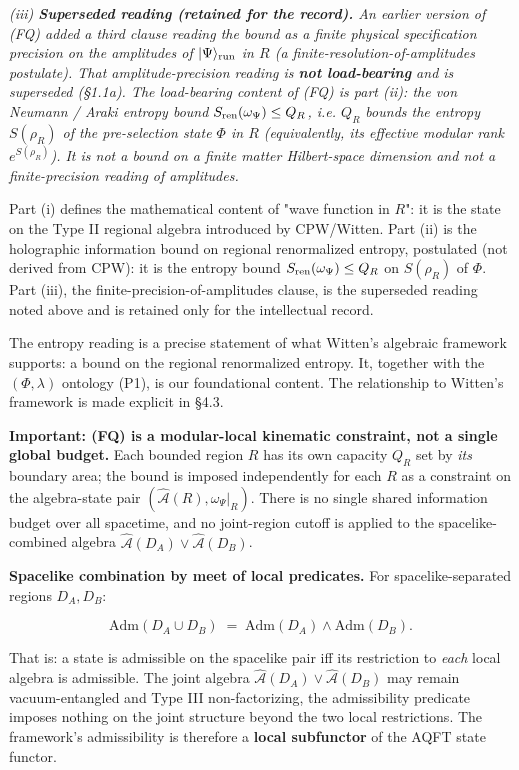 \documentclass[11pt,a4paper]{article}
\begin{document}
\emph{(iii) \textbf{Superseded reading (retained for the record).} An earlier version of (FQ) added a third clause reading the bound as a finite physical specification precision on the amplitudes of $|\Psi\rangle_{\rm run}$ in $R$ (a finite-resolution-of-amplitudes postulate). That amplitude-precision reading is \textbf{not load-bearing} and is superseded (§1.1a). The load-bearing content of (FQ) is part (ii): the von Neumann / Araki entropy bound $S_{\rm ren}(\omega_\Psi) \le Q_R$, i.e. $Q_R$ bounds the entropy $S(\rho_R)$ of the pre-selection state $\Phi$ in $R$ (equivalently, its effective modular rank $e^{S(\rho_R)}$). It is not a bound on a finite matter Hilbert-space dimension and not a finite-precision reading of amplitudes.}

Part (i) defines the mathematical content of "wave function in $R$": it is the state on the Type II regional algebra introduced by CPW/Witten. Part (ii) is the holographic information bound on regional renormalized entropy, postulated (not derived from CPW): it is the entropy bound $S_{\rm ren}(\omega_\Psi) \le Q_R$ on $S(\rho_R)$ of $\Phi$. Part (iii), the finite-precision-of-amplitudes clause, is the superseded reading noted above and is retained only for the intellectual record.

The entropy reading is a precise statement of what Witten's algebraic framework supports: a bound on the regional renormalized entropy. It, together with the $(\Phi,\lambda)$ ontology (P1), is our foundational content. The relationship to Witten's framework is made explicit in §4.3.

\textbf{Important: (FQ) is a modular-local kinematic constraint, not a single global budget.} Each bounded region $R$ has its own capacity $Q_R$ set by \emph{its} boundary area; the bound is imposed independently for each $R$ as a constraint on the algebra-state pair $(\hat{\mathcal{A}}(R), \omega_\Psi|_R)$. There is no single shared information budget over all spacetime, and no joint-region cutoff is applied to the spacelike-combined algebra $\hat{\mathcal{A}}(D_A) \vee \hat{\mathcal{A}}(D_B)$.

\textbf{Spacelike combination by meet of local predicates.} For spacelike-separated regions $D_A, D_B$:

\[
\mathrm{Adm}(D_A \cup D_B) \;=\; \mathrm{Adm}(D_A) \wedge \mathrm{Adm}(D_B).
\]

That is: a state is admissible on the spacelike pair iff its restriction to \emph{each} local algebra is admissible. The joint algebra $\hat{\mathcal{A}}(D_A) \vee \hat{\mathcal{A}}(D_B)$ may remain vacuum-entangled and Type III non-factorizing, the admissibility predicate imposes nothing on the joint structure beyond the two local restrictions. The framework's admissibility is therefore a \textbf{local subfunctor} of the AQFT state functor.
\end{document}
